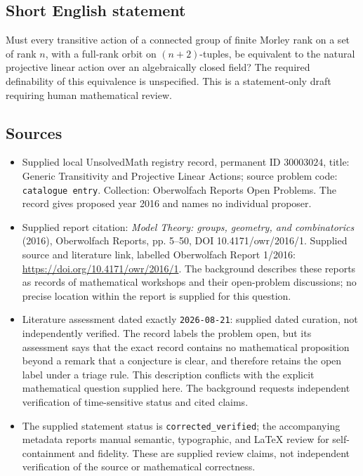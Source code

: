 \documentclass[11pt]{article}
\begin{document}
\subsection{Short English statement}
Must every transitive action of a connected group of finite Morley rank on a set of rank \(n\), with a full-rank orbit on \((n+2)\)-tuples, be equivalent to the natural projective linear action over an algebraically closed field? The required definability of this equivalence is unspecified. This is a statement-only draft requiring human mathematical review.
\subsection{Sources}
\begin{itemize}
\item Supplied local UnsolvedMath registry record, permanent ID \(30003024\), title: Generic Transitivity and Projective Linear Actions; source problem code: \texttt{catalogue entry}. Collection: Oberwolfach Reports Open Problems. The record gives proposed year 2016 and names no individual proposer.
\item Supplied report citation: \emph{Model Theory: groups, geometry, and combinatorics} (2016), Oberwolfach Reports, pp. 5--50, DOI 10.4171/owr/2016/1. Supplied source and literature link, labelled Oberwolfach Report 1/2016: \url{https://doi.org/10.4171/owr/2016/1}. The background describes these reports as records of mathematical workshops and their open-problem discussions; no precise location within the report is supplied for this question.
\item Literature assessment dated exactly \texttt{2026-08-21}: supplied dated curation, not independently verified. The record labels the problem open, but its assessment says that the exact record contains no mathematical proposition beyond a remark that a conjecture is clear, and therefore retains the open label under a triage rule. This description conflicts with the explicit mathematical question supplied here. The background requests independent verification of time-sensitive status and cited claims.
\item The supplied statement status is \texttt{corrected\_verified}; the accompanying metadata reports manual semantic, typographic, and LaTeX review for self-containment and fidelity. These are supplied review claims, not independent verification of the source or mathematical correctness.
\end{itemize}
\end{document}

